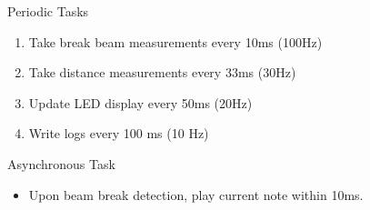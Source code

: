 \documentclass[
11pt,notheorems,hyperref={pdfauthor=whatever}
]{beamer}
\begin{document}
\begin{frame}

\begin{block}{Periodic Tasks}
\begin{enumerate}
    \item Take break beam measurements every 10ms (100Hz)
    \item Take distance measurements every 33ms (30Hz)
    \item Update LED display every 50ms (20Hz)
    \item Write logs every 100 ms (10 Hz)
\end{enumerate}
\end{block}

\begin{block}{Asynchronous Task}
\begin{itemize}
    \item Upon beam break detection, play current
        note within 10ms.
\end{itemize}
\end{block}

\end{frame}
\end{document}
